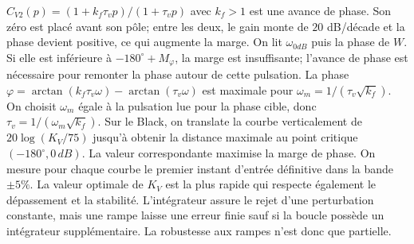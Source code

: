 \begin{corrigebox}
$C_{V2}(p)=(1+k_f\tau_vp)/(1+\tau_vp)$ avec $k_f>1$ est une avance de
            phase. Son zéro est placé avant son pôle; entre les deux, le gain monte de
            $20$ dB/décade et la phase devient positive, ce qui augmente la marge.
On lit $\omega_{0dB}$ puis la phase de $W$. Si elle est inférieure à
            $-180^\circ+M_{\varphi}$, la marge est insuffisante; l'avance de phase est
            nécessaire pour remonter la phase autour de cette pulsation.
La phase
            $\varphi=\arctan(k_f\tau_v\omega)-\arctan(\tau_v\omega)$ est maximale pour
            $\boxed{\omega_m=1/(\tau_v\sqrt{k_f})}$.
On choisit $\omega_m$ égale à la pulsation lue pour la phase cible, donc
            $\boxed{\tau_v=1/(\omega_m\sqrt{k_f})}$.
Sur le Black, on translate la courbe verticalement de
            $20\log(K_V/75)$ jusqu'à obtenir la distance maximale au point critique
            $(-180^\circ,0\,dB)$. La valeur correspondante maximise la marge de phase.
On mesure pour chaque courbe le premier instant d'entrée définitive dans
            la bande $\pm5\%$. La valeur optimale de $K_V$ est la plus rapide qui respecte
            également le dépassement et la stabilité.
L'intégrateur assure le rejet d'une perturbation constante, mais une rampe
            laisse une erreur finie sauf si la boucle possède un intégrateur supplémentaire.
            La robustesse aux rampes n'est donc que partielle.
\end{corrigebox}
